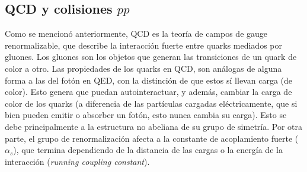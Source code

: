 



\subsection{QCD y colisiones $pp$}\label{sec:qcd_pp}

Como se mencionó anteriormente, QCD \cite{qcd_collider, tesis_martin} es la teoría de campos de gauge renormalizable,
que describe la interacción fuerte entre quarks mediados por gluones. Los gluones son los objetos que generan las transiciones de un quark de color a otro. Las propiedades de los quarks en QCD, son análogas de alguna forma a las del fotón en QED, con la distinción de que estos sí llevan carga (de color). Esto genera que puedan autointeractuar, y además, cambiar la carga de color de los quarks (a diferencia de las partículas cargadas eléctricamente, que si bien pueden emitir o absorber un fotón, esto nunca cambia su carga). Esto se debe principalmente a la estructura no abeliana de su grupo de simetría.
Por otra parte, el grupo de renormalización afecta a la constante de acoplamiento fuerte ($\alpha_s$), que termina dependiendo de la distancia de las cargas o la energía de la interacción (\textit{running coupling constant}). 

